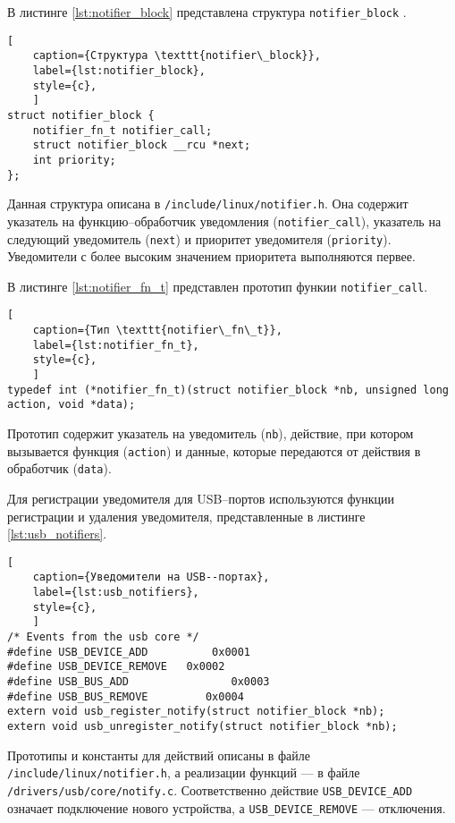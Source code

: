 В листинге \ref{lst:notifier_block} представлена структура \texttt{notifier\_block} \cite{notifier_block}.

\begin{lstlisting}[
	caption={Структура \texttt{notifier\_block}},
	label={lst:notifier_block},
	style={c},
	]
struct notifier_block {
	notifier_fn_t notifier_call;
	struct notifier_block __rcu *next;
	int priority;
};
\end{lstlisting}

Данная структура описана в \texttt{/include/linux/notifier.h}. Она содержит указатель на функцию--обработчик уведомления (\texttt{notifier\_call}), указатель на следующий уведомитель (\texttt{next}) и приоритет уведомителя (\texttt{priority}). Уведомители с более высоким значением приоритета выполняются первее.

В листинге \ref{lst:notifier_fn_t} представлен прототип функии \texttt{notifier\_call}.

\begin{lstlisting}[
	caption={Тип \texttt{notifier\_fn\_t}},
	label={lst:notifier_fn_t},
	style={c},
	]
typedef	int (*notifier_fn_t)(struct notifier_block *nb, unsigned long action, void *data);
\end{lstlisting}

Прототип содержит указатель на уведомитель (\texttt{nb}), действие, при котором вызывается функция (\texttt{action}) и данные, которые передаются от действия в обработчик (\texttt{data}).

\newpage
Для регистрации уведомителя для USB--портов используются функции регистрации и удаления уведомителя, представленные в листинге \ref{lst:usb_notifiers}.

\begin{lstlisting}[
	caption={Уведомители на USB--портах},
	label={lst:usb_notifiers},
	style={c},
	]
/* Events from the usb core */
#define USB_DEVICE_ADD		    0x0001
#define USB_DEVICE_REMOVE	0x0002
#define USB_BUS_ADD		           0x0003
#define USB_BUS_REMOVE		   0x0004
extern void usb_register_notify(struct notifier_block *nb);
extern void usb_unregister_notify(struct notifier_block *nb);
\end{lstlisting}

Прототипы и константы для действий описаны в файле\\ \texttt{/include/linux/notifier.h}, а реализации функций --- в файле\\ \texttt{/drivers/usb/core/notify.c}. Соответственно действие \texttt{USB\_DEVICE\_ADD} означает подключение нового устройства, а \texttt{USB\_DEVICE\_REMOVE} --- отключения.

